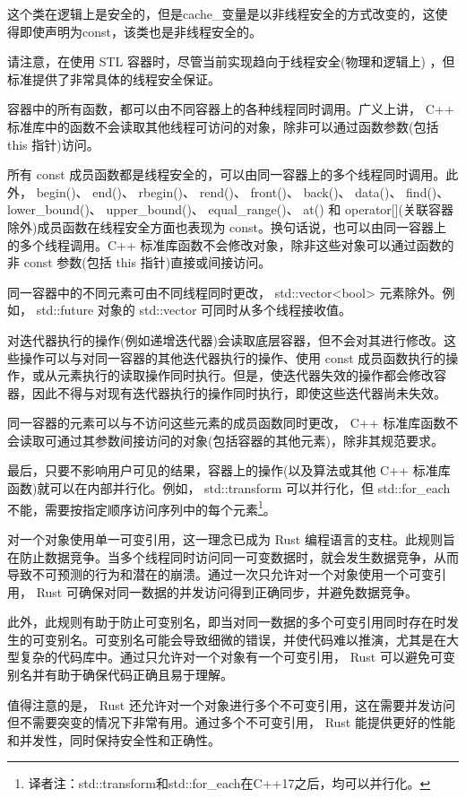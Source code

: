 这个类在逻辑上是安全的，但是cache\_变量是以非线程安全的方式改变的，这使得即使声明为const，该类也是非线程安全的。

请注意，在使用 STL 容器时，尽管当前实现趋向于线程安全(物理和逻辑上) ，但标准提供了非常具体的线程安全保证。

容器中的所有函数，都可以由不同容器上的各种线程同时调用。广义上讲， C++ 标准库中的函数不会读取其他线程可访问的对象，除非可以通过函数参数(包括 this 指针)访问。

所有 const 成员函数都是线程安全的，可以由同一容器上的多个线程同时调用。此外， begin()、 end()、 rbegin()、 rend()、 front()、 back()、 data()、 find()、 lower\_bound()、 upper\_bound()、 equal\_range()、 at() 和 operator[](关联容器除外)成员函数在线程安全方面也表现为 const。换句话说，也可以由同一容器上的多个线程调用。C++ 标准库函数不会修改对象，除非这些对象可以通过函数的非 const 参数(包括 this 指针)直接或间接访问。

同一容器中的不同元素可由不同线程同时更改， std::vector<bool> 元素除外。例如， std::future 对象的 std::vector 可同时从多个线程接收值。

对迭代器执行的操作(例如递增迭代器)会读取底层容器，但不会对其进行修改。这些操作可以与对同一容器的其他迭代器执行的操作、使用 const 成员函数执行的操作，或从元素执行的读取操作同时执行。但是，使迭代器失效的操作都会修改容器，因此不得与对现有迭代器执行的操作同时执行，即使这些迭代器尚未失效。

同一容器的元素可以与不访问这些元素的成员函数同时更改， C++ 标准库函数不会读取可通过其参数间接访问的对象(包括容器的其他元素)，除非其规范要求。

最后，只要不影响用户可见的结果，容器上的操作(以及算法或其他 C++ 标准库函数)就可以在内部并行化。例如， std::transform 可以并行化，但 std::for\_each 不能，需要按指定顺序访问序列中的每个元素\footnote{译者注：std::transform和std::for\_each在C++17之后，均可以并行化。}。

对一个对象使用单一可变引用，这一理念已成为 Rust 编程语言的支柱。此规则旨在防止数据竞争。当多个线程同时访问同一可变数据时，就会发生数据竞争，从而导致不可预测的行为和潜在的崩溃。通过一次只允许对一个对象使用一个可变引用， Rust 可确保对同一数据的并发访问得到正确同步，并避免数据竞争。

此外，此规则有助于防止可变别名，即当对同一数据的多个可变引用同时存在时发生的可变别名。可变别名可能会导致细微的错误，并使代码难以推演，尤其是在大型复杂的代码库中。通过只允许对一个对象有一个可变引用， Rust 可以避免可变别名并有助于确保代码正确且易于理解。

值得注意的是， Rust 还允许对一个对象进行多个不可变引用，这在需要并发访问但不需要突变的情况下非常有用。通过多个不可变引用， Rust 能提供更好的性能和并发性，同时保持安全性和正确性。






